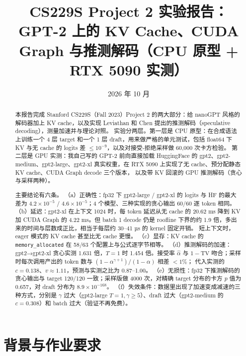 \documentclass[11pt,a4paper]{ctexart}
\title{CS229S Project 2 实验报告：\\GPT-2 上的 KV Cache、CUDA Graph 与推测解码（CPU 原型 + RTX 5090 实测）}
\author{\authorline}
\date{2026 年 10 月}
\begin{document}
\maketitle

\begin{abstract}
本报告完成 Stanford CS229S（Fall 2023）Project 2 的两大部分：给 nanoGPT 风格的解码器加上 KV cache，以及实现 Leviathan 和 Chen 提出的推测解码（speculative decoding），测量加速并与理论对照。
实验分两层。第一层是 CPU 原型：在合成语法上训练一个 4 层 target 和一个 1 层 draft，用来做严格的单元测试，包括 float64 下 KV 与无 cache 的 logits 差 $\le 10^{-9}$，以及对接受-拒绝采样做 60{,}000 次卡方检验。
第二层是 GPU 实测：我自己写的 GPT-2 前向直接加载 HuggingFace 的 gpt2、gpt2-medium、gpt2-large、gpt2-xl 真实权重，在 RTX 5090 上实现了无 cache、预分配静态 KV cache、CUDA Graph decode 三个版本，
以及带 KV 回滚的 GPU 推测解码（贪心与采样两种）。

主要结论有六条。
（a）正确性：fp32 下 gpt2-large / gpt2-xl 的 logits 与 HF 的最大差为 $4.2\times10^{-5}$ / $4.6\times10^{-5}$；4 个模型、三种实现的贪心输出 60/60 逐 token 相同。
（b）延迟：gpt2-xl 在上下文 1024 时，每 token 延迟从无 cache 的 20.62 ms 降到 KV 加 CUDA Graph 的 4.22 ms。但 batch 1 decode 仍是 roofline 下界的约 1.9 倍，多出来的时间与层数成正比，相当于每层约 30--41 µs 的 kernel 固定开销。
短上下文时，eager 模式的 KV cache 甚至比无 cache 更慢。
（c）显存：KV cache 的 \texttt{memory\_allocated} 在 58/63 个配置上与公式逐字节相等。
（d）推测解码的加速：gpt2→gpt2-xl 贪心实测 1.631 倍，$T{=}1$ 时 1.454 倍。接受率 $\hat\alpha$ 与 $1-\mathrm{TV}$ 吻合；采样时每次调用产出的 token 数与 $(1-\alpha^{\gamma+1})/(1-\alpha)$ 相差 $<1\%$；
代入实测的 $c{=}0.138$、$v{\approx}1.11$，预测与实测之比为 0.87--1.00。
（e）无损性：fp32 下推测解码的贪心输出与 target 120/120 一致；采样版做 4000 次，对精确 target 分布的卡方 $p$ 值为 0.657，对 draft 分布为 $8.9\times10^{-168}$。
（f）失效条件：数据里出现了加速变成减速的三种方式，分别是 $\gamma$ 过大（gpt2-large $T{=}1,\gamma\ge5$）、draft 过大（gpt2-medium 的 $c{=}0.308$）和 batch 过大（验证不再免费）。
\end{abstract}

\tableofcontents
\newpage

\section{背景与作业要求}
\end{document}
